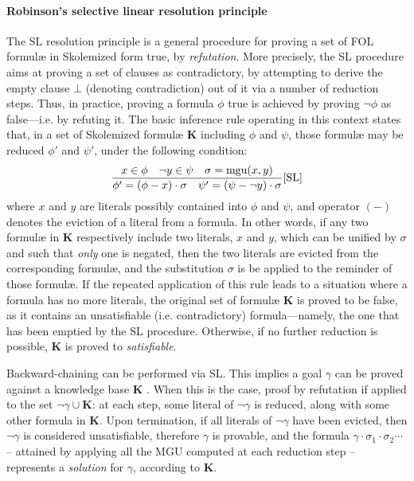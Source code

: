 \documentclass[12pt,a4paper,openright,twoside]{book}
\begin{document}
\paragraph{Robinson's selective linear resolution principle}

The SL resolution principle \cite{robinson1965} is a general procedure for proving a set of FOL formul\ae{} in Skolemized form\footnotemark{} true, by \emph{refutation}.
%
More precisely, the SL procedure aims at proving a set of clauses as contradictory, by attempting to derive the empty clause $\bot$ (denoting contradiction) out of it via a number of reduction steps.
%
Thus, in practice, proving a formula $\phi$ true is achieved by proving $\lnot\phi$ as false---i.e. by refuting it.
%
The basic inference rule operating in this context states that, in a set of Skolemized formul\ae{} $\mathbf{K}$ including $\phi$ and $\psi$, those formul\ae{} may be reduced $\phi'$ and $\psi'$, under the following condition:
%
\begin{equation*}
    \frac{x \in \phi \quad \lnot y \in \psi \quad \sigma = \text{mgu}(x, y)}{\phi' = (\phi - x)\cdot\sigma \quad \psi' = (\psi - \lnot y)\cdot\sigma}[\text{SL}]
\end{equation*}
%
where $x$ and $y$ are literals possibly contained into $\phi$ and $\psi$, and operator $(-)$ denotes the eviction of a literal from a formula.
%
In other words, if any two formul\ae{} in $\mathbf{K}$ respectively include two literals, $x$ and $y$, which can be unified by $\sigma$ and such that \emph{only} one is negated, then the two literals are evicted from the corresponding formul\ae{}, and the substitution $\sigma$ is be applied to the reminder of those formul\ae{}.
%
If the repeated application of this rule leads to a situation where a formula has no more literals, the original set of formul\ae{} $\mathbf{K}$ is proved to be false, as it contains an unsatisfiable (i.e. contradictory) formula---namely, the one that has been emptied by the SL procedure.
%
Otherwise, if no further reduction is possible, $\mathbf{K}$ is proved to \emph{satisfiable}.


Backward-chaining can be performed via SL.
%
This implies a goal $\gamma$ can be proved against a knowledge base $\mathbf{K}$ .
%
When this is the case, proof by refutation if applied to the set $\lnot\gamma \cup \mathbf{K}$: at each step, some literal of $\lnot\gamma$ is reduced, along with some other formula in $\textbf{K}$.
%
Upon termination, if all literals of $\lnot\gamma$ have been evicted, then $\lnot\gamma$ is considered unsatisfiable, therefore $\gamma$ is provable, and the formula $\gamma \cdot \sigma_1 \cdot \sigma_2 \cdots$ -- attained by applying all the MGU computed at each reduction step -- represents a \emph{solution} for $\gamma$, according to $\mathbf{K}$.
\end{document}
